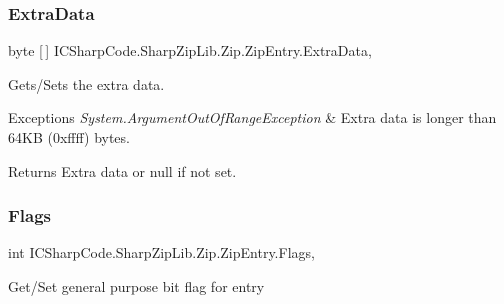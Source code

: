\subsubsection{\texorpdfstring{Extra\+Data}{ExtraData}}
{\footnotesize\ttfamily byte \mbox{[}$\,$\mbox{]} I\+C\+Sharp\+Code.\+Sharp\+Zip\+Lib.\+Zip.\+Zip\+Entry.\+Extra\+Data\hspace{0.3cm}{\ttfamily [get]}, {\ttfamily [set]}}



Gets/\+Sets the extra data. 


\begin{DoxyExceptions}{Exceptions}
{\em System.\+Argument\+Out\+Of\+Range\+Exception} & Extra data is longer than 64\+KB (0xffff) bytes. \\
\hline
\end{DoxyExceptions}
\begin{DoxyReturn}{Returns}
Extra data or null if not set. 
\end{DoxyReturn}
\mbox{\label{class_i_c_sharp_code_1_1_sharp_zip_lib_1_1_zip_1_1_zip_entry_a144e1d24c10438c31ccffab26073d40b}} 
\subsubsection{\texorpdfstring{Flags}{Flags}}
{\footnotesize\ttfamily int I\+C\+Sharp\+Code.\+Sharp\+Zip\+Lib.\+Zip.\+Zip\+Entry.\+Flags\hspace{0.3cm}{\ttfamily [get]}, {\ttfamily [set]}}



Get/\+Set general purpose bit flag for entry 

